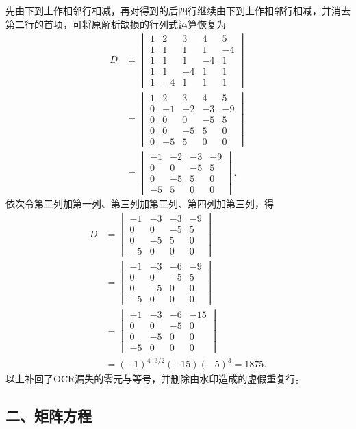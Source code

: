 \documentclass[11pt,fontset=fandol]{ctexart}
\begin{document}
先由下到上作相邻行相减，再对得到的后四行继续由下到上作相邻行相减，并消去第二行的首项，可将原解析缺损的行列式运算恢复为
\[
\begin{aligned}
D&=\begin{vmatrix}
1&2&3&4&5\\1&1&1&1&-4\\1&1&1&-4&1\\1&1&-4&1&1\\1&-4&1&1&1
\end{vmatrix}\\
&=\begin{vmatrix}
1&2&3&4&5\\0&-1&-2&-3&-9\\0&0&0&-5&5\\0&0&-5&5&0\\0&-5&5&0&0
\end{vmatrix}\\
&=\begin{vmatrix}-1&-2&-3&-9\\0&0&-5&5\\0&-5&5&0\\-5&5&0&0\end{vmatrix}.
\end{aligned}
\] 依次令第二列加第一列、第三列加第二列、第四列加第三列，得 \[
\begin{aligned}
D&=\begin{vmatrix}-1&-3&-3&-9\\0&0&-5&5\\0&-5&5&0\\-5&0&0&0\end{vmatrix}\\
&=\begin{vmatrix}-1&-3&-6&-9\\0&0&-5&5\\0&-5&0&0\\-5&0&0&0\end{vmatrix}\\
&=\begin{vmatrix}-1&-3&-6&-15\\0&0&-5&0\\0&-5&0&0\\-5&0&0&0\end{vmatrix}\\
&=(-1)^{4\cdot3/2}(-15)(-5)^3=1875.
\end{aligned}
\] 以上补回了OCR漏失的零元与等号，并删除由水印造成的虚假重复行。

\subsection{二、矩阵方程}\label{ux4e8cux77e9ux9635ux65b9ux7a0b}
\end{document}
